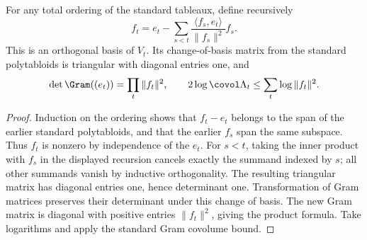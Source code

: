 \begin{lemma}
\label{lem:orthogonal-standard-basis}
\leanok
For any total ordering of the standard tableaux, define recursively
\[
 f_t=e_t-\sum_{s<t}\frac{\langle f_s,e_t\rangle}{\|f_s\|^2}f_s.
\]
This is an orthogonal basis of $V_t$. Its change-of-basis matrix from
the standard polytabloids is triangular with diagonal entries one, and
\[
 \det\Gram((e_t))=\prod_t\|f_t\|^2,\qquad
 2\log\covol\Lambda_t\leq\sum_t\log\|f_t\|^2.
\]
\end{lemma}
\begin{proof}
Induction on the ordering shows that $f_t-e_t$ belongs to the span of
the earlier standard polytabloids, and that the earlier $f_s$ span the
same subspace. Thus $f_t$ is nonzero by independence of the $e_t$.
For $s<t$, taking the inner product with $f_s$ in the displayed
recursion cancels exactly the summand indexed by $s$; all other
summands vanish by inductive orthogonality. The resulting triangular
matrix has diagonal entries one, hence determinant one. Transformation
of Gram matrices preserves their determinant under this change of
basis. The new Gram matrix is diagonal with positive entries
$\|f_t\|^2$, giving the product formula. Take logarithms and apply
the standard Gram covolume bound.
\end{proof}


